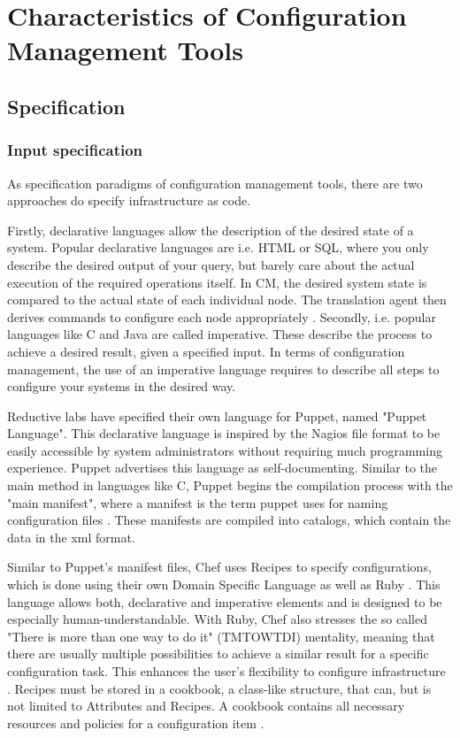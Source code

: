 \section{Characteristics of Configuration Management Tools}

\subsection{Specification}

\subsubsection{Input specification}

As specification paradigms of configuration management tools, there are two approaches do specify infrastructure as code. 

Firstly, declarative languages allow the description of the desired state of a system. Popular declarative languages are i.e. HTML or SQL, where you only describe the desired output of your query, but barely care about the actual execution of the required operations itself. In CM, the desired system state is compared to the actual state of each individual node. The translation agent then derives commands to configure each node appropriately \cite{delaet2010survey}. Secondly, i.e. popular languages like C and Java are called imperative. These describe the process to achieve a desired result, given a specified input. In terms of configuration management, the use of an imperative language requires to describe all steps to configure your systems in the desired way.

Reductive labs have specified their own language for Puppet, named "Puppet Language". This declarative language is inspired by the Nagios file format to be easily accessible by system administrators without requiring much programming experience. Puppet advertises this language  as self-documenting.
Similar to the main method in languages like C, Puppet begins the compilation process with the "main manifest", where a manifest is the term puppet uses for naming configuration files \cite{puppetcomlangsum}. These manifests are compiled into catalogs, which contain the data in the xml format.

Similar to Puppet's manifest files, Chef uses Recipes to specify configurations, which is done using their own Domain Specific Language as well as Ruby \cite{pandey2012investigating}. This language allows both, declarative and imperative elements and is designed to be especially human-understandable. With Ruby, Chef also stresses the so called "There is more than one way to do it" (TMTOWTDI)  mentality, meaning that there are usually multiple possibilities to achieve a similar result for a specific configuration task. This enhances the user's flexibility to configure infrastructure \cite{https://docs.chef.io/recipes.html}. Recipes must be stored in a cookbook, a class-like structure, that can, but is not limited to Attributes and Recipes. A cookbook contains all necessary resources and policies for a configuration item \cite{chefiocookbooks}. 

